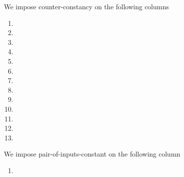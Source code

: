 We impose counter-constancy on the following columns
\begin{multicols}{3}
    \begin{enumerate}
        \item \maxCt
        \item \isInfinity
        \item \accInputs
        \item \trivialPairing
        \item \membershipTestRequired{}
        \item \notOnCOne{}
        \item \notOnCOneAcc{}
        \item \notOnGOne{}
        \item \notOnGOneAcc{}
        \item \notOnCTwo{}
        \item \notOnCTwoAcc{}
        \item \notOnGTwo{}
        \item \notOnGTwoAcc{}
    \end{enumerate}
\end{multicols}
We impose pair-of-inputs-constant on the following column
\begin{multicols}{3}
    \begin{enumerate}
        \item \acceptablePairOfPoints{}
    \end{enumerate}
\end{multicols}
